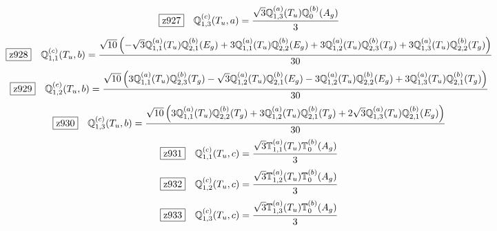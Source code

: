 \documentclass[fleqn,10pt,landscape]{jsarticle}
\begin{document}
\begin{dmath*}
\hspace*{3mm}\fbox{z927}\quad \mathbb{Q}_{1,3}^{(c)}(T_{u},a)=\frac{\sqrt{3} \mathbb{Q}_{1,3}^{(a)}(T_{u}) \mathbb{Q}_{0}^{(b)}(A_{g})}{3}
\end{dmath*}
\begin{dmath*}
\hspace*{3mm}\fbox{z928}\quad \mathbb{Q}_{1,1}^{(c)}(T_{u},b)=\frac{\sqrt{10} \left(- \sqrt{3} \mathbb{Q}_{1,1}^{(a)}(T_{u}) \mathbb{Q}_{2,1}^{(b)}(E_{g}) + 3 \mathbb{Q}_{1,1}^{(a)}(T_{u}) \mathbb{Q}_{2,2}^{(b)}(E_{g}) + 3 \mathbb{Q}_{1,2}^{(a)}(T_{u}) \mathbb{Q}_{2,3}^{(b)}(T_{g}) + 3 \mathbb{Q}_{1,3}^{(a)}(T_{u}) \mathbb{Q}_{2,2}^{(b)}(T_{g})\right)}{30}
\end{dmath*}
\begin{dmath*}
\hspace*{3mm}\fbox{z929}\quad \mathbb{Q}_{1,2}^{(c)}(T_{u},b)=\frac{\sqrt{10} \left(3 \mathbb{Q}_{1,1}^{(a)}(T_{u}) \mathbb{Q}_{2,3}^{(b)}(T_{g}) - \sqrt{3} \mathbb{Q}_{1,2}^{(a)}(T_{u}) \mathbb{Q}_{2,1}^{(b)}(E_{g}) - 3 \mathbb{Q}_{1,2}^{(a)}(T_{u}) \mathbb{Q}_{2,2}^{(b)}(E_{g}) + 3 \mathbb{Q}_{1,3}^{(a)}(T_{u}) \mathbb{Q}_{2,1}^{(b)}(T_{g})\right)}{30}
\end{dmath*}
\begin{dmath*}
\hspace*{3mm}\fbox{z930}\quad \mathbb{Q}_{1,3}^{(c)}(T_{u},b)=\frac{\sqrt{10} \left(3 \mathbb{Q}_{1,1}^{(a)}(T_{u}) \mathbb{Q}_{2,2}^{(b)}(T_{g}) + 3 \mathbb{Q}_{1,2}^{(a)}(T_{u}) \mathbb{Q}_{2,1}^{(b)}(T_{g}) + 2 \sqrt{3} \mathbb{Q}_{1,3}^{(a)}(T_{u}) \mathbb{Q}_{2,1}^{(b)}(E_{g})\right)}{30}
\end{dmath*}
\begin{dmath*}
\hspace*{3mm}\fbox{z931}\quad \mathbb{Q}_{1,1}^{(c)}(T_{u},c)=\frac{\sqrt{3} \mathbb{T}_{1,1}^{(a)}(T_{u}) \mathbb{T}_{0}^{(b)}(A_{g})}{3}
\end{dmath*}
\begin{dmath*}
\hspace*{3mm}\fbox{z932}\quad \mathbb{Q}_{1,2}^{(c)}(T_{u},c)=\frac{\sqrt{3} \mathbb{T}_{1,2}^{(a)}(T_{u}) \mathbb{T}_{0}^{(b)}(A_{g})}{3}
\end{dmath*}
\begin{dmath*}
\hspace*{3mm}\fbox{z933}\quad \mathbb{Q}_{1,3}^{(c)}(T_{u},c)=\frac{\sqrt{3} \mathbb{T}_{1,3}^{(a)}(T_{u}) \mathbb{T}_{0}^{(b)}(A_{g})}{3}
\end{dmath*}
\end{document}
